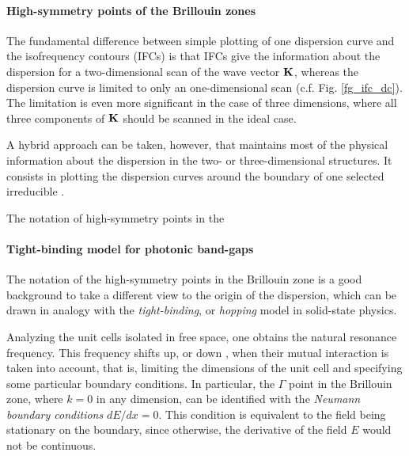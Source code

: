 \paragraph{High-symmetry points of the Brillouin zones} %
The fundamental difference between simple plotting of one dispersion curve and the isofrequency contours (IFCs) is that IFCs give the information about the dispersion for a two-dimensional scan of the wave vector ${\mathbf{K}}$, whereas the dispersion curve is limited to only an one-dimensional scan (c.f. Fig. \ref{fg_ifc_dc}). The limitation is even more significant in the case of three dimensions, where all three components of ${\mathbf{K}}$ should be scanned in the ideal case.

A hybrid approach can be taken, however, that maintains most of the physical information about the dispersion in the two- or three-dimensional structures. It consists in plotting the  dispersion curves around the boundary of one selected irreducible .

The notation of high-symmetry points in the  %

\paragraph{Tight-binding model for photonic band-gaps} %
The notation of the high-symmetry points in the Brillouin zone is a good background to take  a different view to the origin of the dispersion, which can be drawn in analogy with the \textit{tight-binding},   %
or \textit{hopping}  %
model in solid-state physics. 

\label{hopping}
Analyzing the unit cells isolated in free space, one obtains the natural resonance frequency.
This frequency shifts up, or down \cite[p. 75]{klingshirn2007semiconductor}, when their mutual interaction is taken into account, that is, limiting the dimensions of the unit cell and specifying some particular boundary conditions.
In particular, the $\Gamma$ point in the Brillouin zone, where $k = 0$ in any dimension, can be identified with the \textit{Neumann boundary conditions} $dE/dx = 0$. This condition is equivalent to the field being stationary on the boundary, since  otherwise, the derivative of the field $E$ would not be continuous. %

